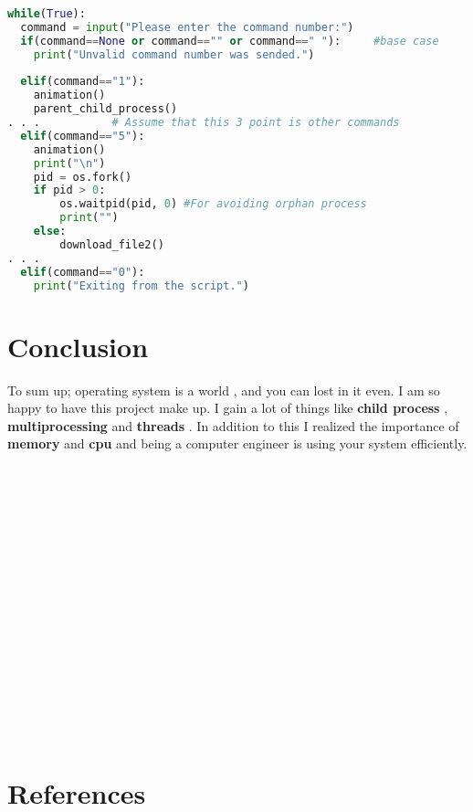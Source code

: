 \documentclass[onecolumn]{article}
\begin{document}
\begin{lstlisting}[language=Python, caption=Driver Codes ]
while(True):
  command = input("Please enter the command number:")
  if(command==None or command=="" or command==" "):     #base case
    print("Unvalid command number was sended.")
 
  elif(command=="1"):
    animation()
    parent_child_process()
. . .           # Assume that this 3 point is other commands 
  elif(command=="5"):
    animation()
    print("\n")
    pid = os.fork() 
    if pid > 0: 
        os.waitpid(pid, 0) #For avoiding orphan process 
        print("")    
    else: 
        download_file2()
. . .   
  elif(command=="0"):
    print("Exiting from the script.")
    \end{lstlisting}



\section{Conclusion}

To sum up; operating system is a world , and you can lost in it even. I am so happy to have this project make up. I gain a lot of things like\textbf{ child process },\textbf{ multiprocessing} and\textbf{ threads} . In addition to this I realized the importance of \textbf{memory} and \textbf{cpu} and being a computer engineer is using your system efficiently.\\\\\\\\\\\\\\\\\\\\\\\\\\\\\\\\\\

\section{References}
\end{document}
